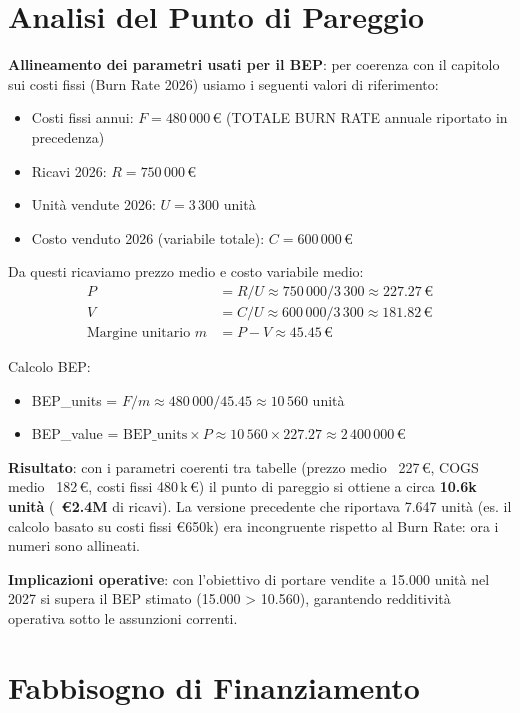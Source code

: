 \documentclass[11pt,a4paper]{report}
\begin{document}
\section{Analisi del Punto di Pareggio}

\textbf{Allineamento dei parametri usati per il BEP}: per coerenza con il capitolo sui costi fissi (Burn Rate 2026) usiamo i seguenti valori di riferimento:
\begin{itemize}
    \item Costi fissi annui: $F = 480\,000\,\euro$ (TOTALE BURN RATE annuale riportato in precedenza)
    \item Ricavi 2026: $R = 750\,000\,\euro$
    \item Unità vendute 2026: $U = 3\,300$ unit\`a
    \item Costo venduto 2026 (variabile totale): $C = 600\,000\,\euro$
\end{itemize}

Da questi ricaviamo prezzo medio e costo variabile medio:
\begin{align*}
P &= R / U \approx 750\,000 / 3\,300 \approx 227.27\,\euro\\
V &= C / U \approx 600\,000 / 3\,300 \approx 181.82\,\euro\\
\text{Margine unitario } m &= P - V \approx 45.45\,\euro
\end{align*}

Calcolo BEP:
\begin{itemize}
    \item BEP\_units = $F / m \approx 480\,000 / 45.45 \approx 10\,560$ unit\`a
    \item BEP\_value = \(\mathrm{BEP\_units}\times P \approx 10\,560 \times 227.27 \approx 2\,400\,000\,\euro\)
\end{itemize}

\textbf{Risultato}: con i parametri coerenti tra tabelle (prezzo medio ~227\,\euro, COGS medio ~182\,\euro, costi fissi 480\,k\,\euro) il punto di pareggio si ottiene a circa \textbf{10.6k unit\`a} (~\textbf{€2.4M} di ricavi). La versione precedente che riportava 7.647 unit\`a (es. il calcolo basato su costi fissi €650k) era incongruente rispetto al Burn Rate: ora i numeri sono allineati.

\textbf{Implicazioni operative}: con l'obiettivo di portare vendite a 15.000 unit\`a nel 2027 si supera il BEP stimato (15.000 > 10.560), garantendo redditività operativa sotto le assunzioni correnti.

\section{Fabbisogno di Finanziamento}
\end{document}
